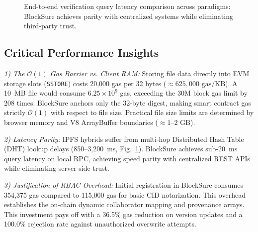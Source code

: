 \documentclass[10pt,conference,letterpaper]{IEEEtran}
\begin{document}
\begin{figure}[htbp]
\centering
{}
\caption{End-to-end verification query latency comparison across paradigms: BlockSure achieves parity with centralized systems while eliminating third-party trust.}
\label{fig:latency_comparison}
\end{figure}

\subsection{Critical Performance Insights}
\textit{1) The $\mathcal{O}(1)$ Gas Barrier vs. Client RAM:} Storing file data directly into EVM storage slots (\texttt{SSTORE}) costs 20,000 gas per 32 bytes ($\approx 625{,}000\text{ gas/KB}$). A 10~MB file would consume $6.25 \times 10^9$ gas, exceeding the 30M block gas limit by 208 times. BlockSure anchors only the 32-byte digest, making smart contract gas strictly $\mathcal{O}(1)$ with respect to file size. Practical file size limits are determined by browser memory and V8 ArrayBuffer boundaries ($\approx 1\text{--}2\text{ GB}$).

\textit{2) Latency Parity:} IPFS hybrids suffer from multi-hop Distributed Hash Table (DHT) lookup delays (850--3,200~ms, Fig.~\ref{fig:latency_comparison}). BlockSure achieves sub-20~ms query latency on local RPC, achieving speed parity with centralized REST APIs while eliminating server-side trust.

\textit{3) Justification of RBAC Overhead:} Initial registration in BlockSure consumes 354,375 gas compared to 115,000 gas for basic CID notarization. This overhead establishes the on-chain dynamic collaborator mapping and provenance arrays. This investment pays off with a 36.5\% gas reduction on version updates and a 100.0\% rejection rate against unauthorized overwrite attempts.
\end{document}
